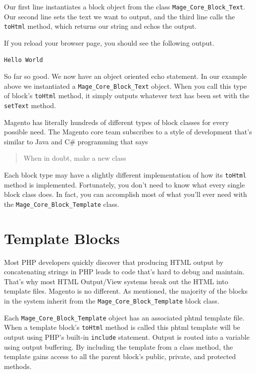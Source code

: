 \documentclass[oneside]{book}
\begin{document}
Our first line instantiates a block object from the class \footnotesize\texttt{Mage\_Core\_Block\_Text}\normalsize.  Our second line sets the text we want to output, and the third line calls the \footnotesize\texttt{toHtml} \normalsize  method, which returns our string and echos the output.  

If you reload your browser page, you should see the following output.

\begin{lstlisting}
Hello World

\end{lstlisting}


So far so good. We now have an object oriented echo statement. In our example above we instantiated a \footnotesize\texttt{Mage\_Core\_Block\_Text} \normalsize  object. When you call this type of block's \footnotesize\texttt{toHtml} \normalsize  method, it simply outputs whatever text has been set with the \footnotesize\texttt{setText} \normalsize  method.

Magento has literally hundreds of different types of block classes for every possible need. The Magento core team subscribes to a style of development that's similar to Java and C\# programming that says

\begin{quote}
When in doubt, make a new class
\end{quote}

Each block type may have a slightly different implementation of how its \footnotesize\texttt{toHtml} \normalsize  method is implemented.  Fortunately, you don't need to know what every single block class does.  In fact, you can accomplish most of what you'll ever need with the \footnotesize\texttt{Mage\_Core\_Block\_Template} \normalsize  class.

\section{Template Blocks}

Most PHP developers quickly discover that producing HTML output by concatenating strings in PHP leads to code that's hard to debug and maintain.  That's why most HTML Output/View systems break out the HTML into template files.  Magento is no different.  As mentioned, the majority of the blocks in the system inherit from the \footnotesize\texttt{Mage\_Core\_Block\_Template} \normalsize  block class.  

Each \footnotesize\texttt{Mage\_Core\_Block\_Template} \normalsize  object has an associated phtml template file.  When a template block's \footnotesize\texttt{toHtml} \normalsize  method is called this phtml template will be output using PHP's built-in \footnotesize\texttt{include} \normalsize  statement.  Output is routed into a variable using output buffering.  By including the template from a class method, the template gains access to all the parent block's public, private, and protected methods.
\end{document}
